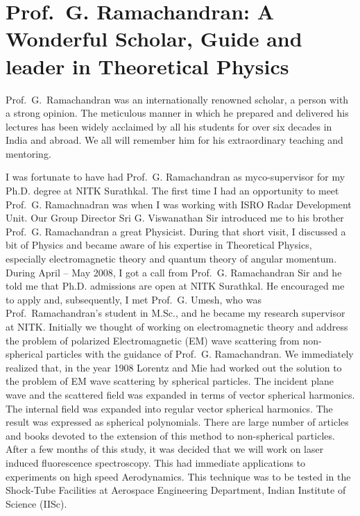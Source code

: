 \chapter{Prof.\ G. Ramachandran: A Wonderful Scholar, Guide and leader in Theoretical Physics}\label{chap35}



Prof.\ G.\ Ramachandran was an internationally renowned scholar, a person with a strong opinion. The meticulous manner in which he prepared and delivered his lectures has been widely acclaimed by all his students for over six decades in India and abroad. We all will remember him for his extraordinary teaching and mentoring.

I was fortunate to have had Prof.\ G. Ramachandran as my\break co-supervisor for my Ph.D. degree at NITK Surathkal. The first time I had an opportunity to meet Prof.\ G. Ramachnadran was when I was working with ISRO Radar Development Unit. Our Group Director Sri G. Viswanathan Sir introduced me to his brother Prof.\ G. Ramachandran a great Physicist. During that short visit, I discussed a bit of Physics and became aware of his expertise in Theoretical Physics, especially electromagnetic theory and quantum theory of angular momentum. During April -- May 2008, I got a call from Prof.\ G. Ramachandran Sir and he told me that Ph.D. admissions are open at NITK Surathkal. He encouraged me to apply and, subsequently, I met Prof.\ G. Umesh, who was Prof.\ Ramachandran's student in M.Sc., and he became my research supervisor at NITK. Initially we thought of working on electromagnetic theory and address the problem of polarized Electromagnetic (EM) wave scattering from non-spherical particles with the guidance of Prof.\ G. Ramachandran. We immediately realized that, in the year 1908 Lorentz and Mie had worked out the solution to the problem of EM wave scattering by spherical particles. The incident plane wave and the scattered field was expanded in terms of vector spherical harmonics. The internal field was expanded into regular vector spherical harmonics. The result was expressed as spherical polynomials. There are large number of articles and books devoted to the extension of this method to non-spherical particles. After a few months of this study, it was decided that we will work on  laser induced fluorescence spectroscopy. This had immediate applications to experiments on high speed Aerodynamics. This technique was to be tested in the Shock-Tube Facilities at Aerospace Engineering Department, Indian Institute of Science (IISc).

